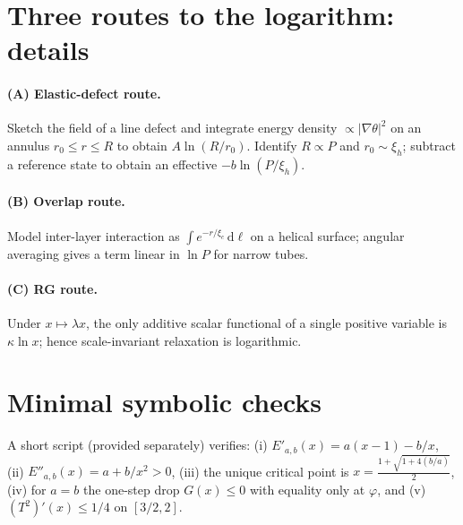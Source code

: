 \documentclass[11pt]{article}
\theoremstyle{remark}
\theoremstyle{definition}
\newcommand{\ph}{\varphi}
\begin{document}
\section{Three routes to the logarithm: details}
\paragraph{(A) Elastic-defect route.} Sketch the field of a line defect and integrate energy density $\propto |\nabla\theta|^2$ on an annulus $r_0\le r\le R$ to obtain $A\ln(R/r_0)$. Identify $R\propto P$ and $r_0\sim \xi_h$; subtract a reference state to obtain an effective $-b\ln(P/\xi_h)$.

\paragraph{(B) Overlap route.} Model inter-layer interaction as $\int e^{-r/\xi_c}\,\mathrm d\ell$ on a helical surface; angular averaging gives a term linear in $\ln P$ for narrow tubes.

\paragraph{(C) RG route.} Under $x\mapsto \lambda x$, the only additive scalar functional of a single positive variable is $\kappa\ln x$; hence scale-invariant relaxation is logarithmic.

\section{Minimal symbolic checks}
A short script (provided separately) verifies: (i) $E'_{a,b}(x)=a(x-1)-b/x$, (ii) $E''_{a,b}(x)=a+b/x^2>0$, (iii) the unique critical point is $x=\tfrac{1+\sqrt{1+4(b/a)}}2$, (iv) for $a=b$ the one-step drop $G(x)\le0$ with equality only at $\ph$, and (v) $(T^2)'(x)\le 1/4$ on $[3/2,2]$.


\end{document}
